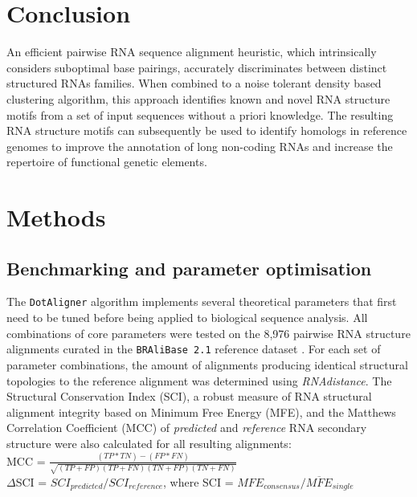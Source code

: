 \documentclass{bmcart}
\newcommand\dotaligner{\texttt{DotAligner}}
\newcommand\bralibase{\texttt{BRAliBase 2.1}}
\begin{document}
\section*{Conclusion}
An efficient pairwise RNA sequence alignment heuristic, which intrinsically considers
suboptimal base pairings, accurately discriminates between distinct structured RNAs families.
When combined to a noise tolerant density based clustering algorithm, this 
approach identifies known and novel RNA structure motifs from a set of input sequences 
without a priori knowledge. The resulting RNA structure motifs can subsequently 
be used to identify homologs in reference genomes to improve the annotation of 
long non-coding RNAs and increase the repertoire of functional genetic elements. 


\section*{Methods}
\subsection*{Benchmarking and parameter optimisation}

The \dotaligner{} algorithm implements several theoretical parameters that
first need to be tuned before being applied to biological sequence
analysis. All combinations of core parameters were tested on the 8,976
pairwise RNA structure alignments curated in the \bralibase{} reference dataset
\cite{wilm2006enhanced}. For each set of parameter combinations, the amount of
alignments producing identical structural topologies to the reference alignment
was determined using \textit{RNAdistance}. The Structural Conservation Index
(SCI), a robust measure of RNA structural alignment integrity
\cite{gruber2008strategies} based on Minimum Free Energy (MFE), and the Matthews Correlation Coefficient (MCC) of \textit{predicted} and \textit{reference} RNA secondary structure
were also calculated for all resulting alignments: \\

MCC = $\frac{(TP * TN) - (FP * FN)}{ \sqrt{ (TP + FP)(TP + FN)(TN + FP)(TN + FN) }}$\\

$\Delta$SCI = $SCI_{predicted} / SCI_{reference}$, where SCI = $ MFE_{consensus}  / \overline{MFE}_{single}  $\\
\end{document}

